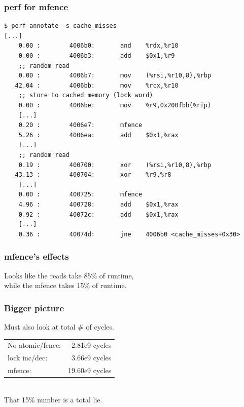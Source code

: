 \begin{frame}[fragile]
  \frametitle{perf for mfence}

  \begin{lstlisting}
$ perf annotate -s cache_misses
[...]
    0.00 :        4006b0:       and    %rdx,%r10
    0.00 :        4006b3:       add    $0x1,%r9
    ;; random read
    0.00 :        4006b7:       mov    (%rsi,%r10,8),%rbp
   42.04 :        4006bb:       mov    %rcx,%r10
    ;; store to cached memory (lock word)
    0.00 :        4006be:       mov    %r9,0x200fbb(%rip)
    [...]
    0.20 :        4006e7:       mfence 
    5.26 :        4006ea:       add    $0x1,%rax
    [...]
    ;; random read
    0.19 :        400700:       xor    (%rsi,%r10,8),%rbp
   43.13 :        400704:       xor    %r9,%r8
    [...]
    0.00 :        400725:       mfence 
    4.96 :        400728:       add    $0x1,%rax
    0.92 :        40072c:       add    $0x1,%rax
    [...]
    0.36 :        40074d:       jne    4006b0 <cache_misses+0x30>
  \end{lstlisting}

\end{frame}

\begin{frame}
  \frametitle{mfence's effects}

  
    Looks like the reads take 85\% of runtime,\\
    while the mfence takes 15\% of runtime.
  

\end{frame}

\begin{frame}
  \frametitle{Bigger picture}

  
    Must also look at total \# of cycles.\\[1em]
    \begin{tabular}{lr}
    No atomic/fence:& 2.81e9 cycles\\
    lock inc/dec: & 3.66e9 cycles\\
    mfence: & 19.60e9 cycles
    \end{tabular}
~\\[1em]
    That 15\% number is a total lie.
  

\end{frame}

